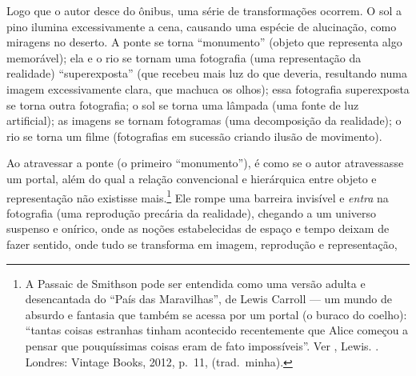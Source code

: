 Logo que o autor desce do ônibus, uma série de transformações ocorrem. O
sol a pino ilumina excessivamente a cena, causando uma espécie de
alucinação, como miragens no deserto. A ponte se torna ``monumento''
(objeto que representa algo memorável); ela e o rio se tornam uma
fotografia (uma representação da realidade) ``superexposta'' (que
recebeu mais luz do que deveria, resultando numa imagem excessivamente
clara, que machuca os olhos); essa fotografia superexposta se torna
outra fotografia; o sol se torna uma lâmpada (uma fonte de luz
artificial); as imagens se tornam fotogramas (uma decomposição da
realidade); o rio se torna um filme (fotografias em sucessão criando
ilusão de movimento).

Ao atravessar a ponte (o primeiro ``monumento''), é como se o autor
atravessasse um portal, além do qual a relação convencional e
hierárquica entre objeto e representação não existisse mais.\footnote{A
  Passaic de Smithson pode ser entendida como uma versão adulta e
  desencantada do ``País das Maravilhas'', de Lewis Carroll --- um mundo
  de absurdo e fantasia que também se acessa por um portal (o buraco do
  coelho): ``tantas coisas estranhas tinham acontecido recentemente que
  Alice começou a pensar que pouquíssimas coisas eram de fato
  impossíveis''. Ver , Lewis. {}. Londres: Vintage Books, 2012, p.~11, (trad.~minha).} Ele
rompe uma barreira invisível e \emph{entra} na fotografia (uma
reprodução precária da realidade), chegando a um universo suspenso e
onírico, onde as noções estabelecidas de espaço e tempo deixam de fazer
sentido, onde tudo se transforma em imagem, reprodução e representação,
